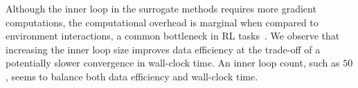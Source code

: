 \documentclass{article} %
\theoremstyle{definition}
\begin{document}
Although the inner loop in the surrogate methods requires more gradient computations, the computational overhead is marginal when compared to environment interactions, a common bottleneck in RL tasks~\citep{vaswani2021general}.
We observe that increasing the inner loop size improves data efficiency at the trade-off of a potentially slower convergence in wall-clock time. 
An inner loop count, such as $50$, seems to balance  both data efficiency and wall-clock time. 






\end{document}

